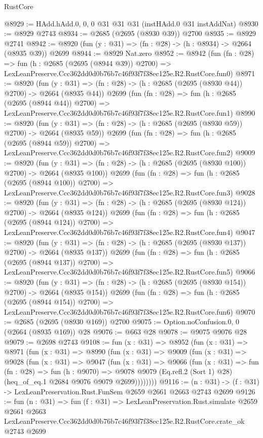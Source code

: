\begin{lexlean}{RustCore}
\begin{coremodule}
@8929 := HAdd.hAdd.{0, 0, 0} @31 @31 @31 (instHAdd.{0} @31 instAddNat)
@8930 := @8929 @2743
@8934 := @2685 (@2695 (@8930 @39)) @2700
@8935 := @8929 @2741
@8942 := @8920 (fun (y : @31) => (fn : @28) -> (h : @8934) -> @2664 (@8935 @39)) @2699
@8944 := @8929 Nat.zero
@8952 := @8942
    (fun (fn : @28) =>
    fun (h : @2685 (@2695 (@8944 @39)) @2700) =>
    LexLeanPreserve.Ccc362dd0d0b76b7c46f93f7f38ec125e.R2.RustCore.fun0)
@8971 := @8920
    (fun (y : @31) => (fn : @28) -> (h : @2685 (@2695 (@8930 @44)) @2700) -> @2664 (@8935 @44))
    @2699
    (fun (fn : @28) =>
    fun (h : @2685 (@2695 (@8944 @44)) @2700) =>
    LexLeanPreserve.Ccc362dd0d0b76b7c46f93f7f38ec125e.R2.RustCore.fun1)
@8990 := @8920
    (fun (y : @31) => (fn : @28) -> (h : @2685 (@2695 (@8930 @59)) @2700) -> @2664 (@8935 @59))
    @2699
    (fun (fn : @28) =>
    fun (h : @2685 (@2695 (@8944 @59)) @2700) =>
    LexLeanPreserve.Ccc362dd0d0b76b7c46f93f7f38ec125e.R2.RustCore.fun2)
@9009 := @8920
    (fun (y : @31) => (fn : @28) -> (h : @2685 (@2695 (@8930 @100)) @2700) -> @2664 (@8935 @100))
    @2699
    (fun (fn : @28) =>
    fun (h : @2685 (@2695 (@8944 @100)) @2700) =>
    LexLeanPreserve.Ccc362dd0d0b76b7c46f93f7f38ec125e.R2.RustCore.fun3)
@9028 := @8920
    (fun (y : @31) => (fn : @28) -> (h : @2685 (@2695 (@8930 @124)) @2700) -> @2664 (@8935 @124))
    @2699
    (fun (fn : @28) =>
    fun (h : @2685 (@2695 (@8944 @124)) @2700) =>
    LexLeanPreserve.Ccc362dd0d0b76b7c46f93f7f38ec125e.R2.RustCore.fun4)
@9047 := @8920
    (fun (y : @31) => (fn : @28) -> (h : @2685 (@2695 (@8930 @137)) @2700) -> @2664 (@8935 @137))
    @2699
    (fun (fn : @28) =>
    fun (h : @2685 (@2695 (@8944 @137)) @2700) =>
    LexLeanPreserve.Ccc362dd0d0b76b7c46f93f7f38ec125e.R2.RustCore.fun5)
@9066 := @8920
    (fun (y : @31) => (fn : @28) -> (h : @2685 (@2695 (@8930 @154)) @2700) -> @2664 (@8935 @154))
    @2699
    (fun (fn : @28) =>
    fun (h : @2685 (@2695 (@8944 @154)) @2700) =>
    LexLeanPreserve.Ccc362dd0d0b76b7c46f93f7f38ec125e.R2.RustCore.fun6)
@9070 := @2685 (@2695 (@8930 @169)) @2700
@9075 := Option.noConfusion.{0, 0} (@2664 (@8935 @169)) @28
@9076 := @663 @28
@9078 := @9075 @9076 @28
@9079 := @2698 @2743
@9108 := fun (x : @31) =>
  @8952
    (fun (x : @31) =>
    @8971
      (fun (x : @31) =>
      @8990
        (fun (x : @31) =>
        @9009
          (fun (x : @31) =>
          @9028
            (fun (x : @31) =>
            @9047
              (fun (x : @31) =>
              @9066
                (fun (x : @31) =>
                fun (fn : @28) =>
                fun (h : @9070) =>
                @9078
                  @9079
                  (Eq.refl.{2} (Sort 1) @28)
                  (heq_of_eq.{1} @2684 @9076 @9079 @2699))))))))
@9116 := (n : @31) -> (f : @31) -> LexLeanPreservation.Rust.FunSem @2659 @2661 @2663 @2743 @2699
@9126 := fun (n : @31) =>
  fun (f : @31) =>
  LexLeanPreservation.Rust.simulate
    @2659
    @2661
    @2663
    LexLeanPreserve.Ccc362dd0d0b76b7c46f93f7f38ec125e.R2.RustCore.crate_ok
    @2743
    @2699
\end{coremodule}
\end{lexlean}
